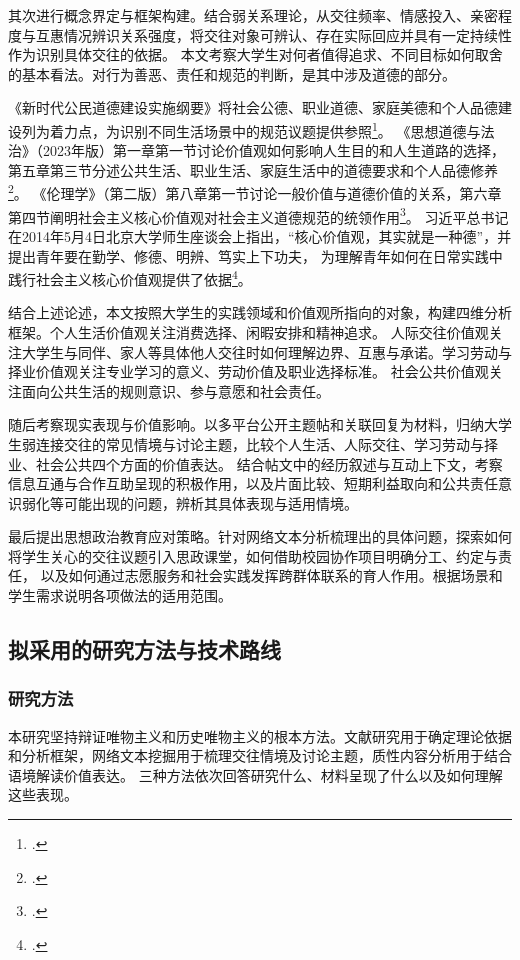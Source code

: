 其次进行概念界定与框架构建。结合弱关系理论，从交往频率、情感投入、亲密程度与互惠情况辨识关系强度，将交往对象可辨认、存在实际回应并具有一定持续性作为识别具体交往的依据。
本文考察大学生对何者值得追求、不同目标如何取舍的基本看法。对行为善恶、责任和规范的判断，是其中涉及道德的部分。

《新时代公民道德建设实施纲要》将社会公德、职业道德、家庭美德和个人品德建设列为着力点，为识别不同生活场景中的规范议题提供参照\footcite{gangyao2019}。
《思想道德与法治》（2023年版）第一章第一节讨论价值观如何影响人生目的和人生道路的选择，
第五章第三节分述公共生活、职业生活、家庭生活中的道德要求和个人品德修养\footcite{sixiangdaode2023}。
《伦理学》（第二版）第八章第一节讨论一般价值与道德价值的关系，第六章第四节阐明社会主义核心价值观对社会主义道德规范的统领作用\footcite{lunlixue2020}。
习近平总书记在2014年5月4日北京大学师生座谈会上指出，“核心价值观，其实就是一种德”，并提出青年要在勤学、修德、明辨、笃实上下功夫，
为理解青年如何在日常实践中践行社会主义核心价值观提供了依据\footcite{Xi2014}。

结合上述论述，本文按照大学生的实践领域和价值观所指向的对象，构建四维分析框架。个人生活价值观关注消费选择、闲暇安排和精神追求。
人际交往价值观关注大学生与同伴、家人等具体他人交往时如何理解边界、互惠与承诺。学习劳动与择业价值观关注专业学习的意义、劳动价值及职业选择标准。
社会公共价值观关注面向公共生活的规则意识、参与意愿和社会责任。

随后考察现实表现与价值影响。以多平台公开主题帖和关联回复为材料，归纳大学生弱连接交往的常见情境与讨论主题，比较个人生活、人际交往、学习劳动与择业、社会公共四个方面的价值表达。
结合帖文中的经历叙述与互动上下文，考察信息互通与合作互助呈现的积极作用，以及片面比较、短期利益取向和公共责任意识弱化等可能出现的问题，辨析其具体表现与适用情境。

最后提出思想政治教育应对策略。针对网络文本分析梳理出的具体问题，探索如何将学生关心的交往议题引入思政课堂，如何借助校园协作项目明确分工、约定与责任，
以及如何通过志愿服务和社会实践发挥跨群体联系的育人作用。根据场景和学生需求说明各项做法的适用范围。

\subsection{拟采用的研究方法与技术路线}

\subsubsection{研究方法}

本研究坚持辩证唯物主义和历史唯物主义的根本方法。文献研究用于确定理论依据和分析框架，网络文本挖掘用于梳理交往情境及讨论主题，质性内容分析用于结合语境解读价值表达。
三种方法依次回答研究什么、材料呈现了什么以及如何理解这些表现。

